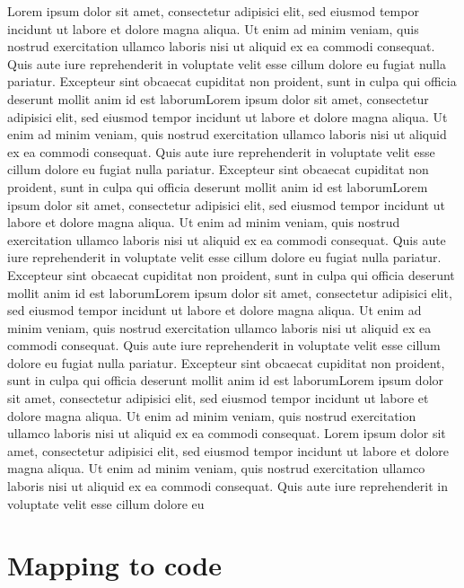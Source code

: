 Lorem ipsum dolor sit amet, consectetur adipisici elit, sed eiusmod tempor incidunt ut labore et dolore magna aliqua.
Ut enim ad minim veniam, quis nostrud exercitation ullamco laboris nisi ut aliquid ex ea commodi consequat. Quis aute iure reprehenderit in voluptate velit esse cillum dolore eu fugiat nulla pariatur. Excepteur sint obcaecat cupiditat non proident, sunt in culpa qui officia deserunt
mollit anim id est laborumLorem ipsum dolor sit amet, consectetur adipisici elit, sed eiusmod tempor incidunt ut labore et dolore magna aliqua. Ut enim ad minim veniam, quis nostrud exercitation ullamco laboris nisi ut aliquid ex ea commodi consequat. Quis aute iure reprehenderit in voluptate velit esse cillum dolore eu fugiat nulla pariatur. Excepteur sint obcaecat cupiditat non proident, sunt in culpa qui officia deserunt mollit anim id est laborumLorem ipsum dolor sit amet, consectetur adipisici elit, sed eiusmod tempor incidunt ut labore et dolore magna aliqua. Ut enim ad minim veniam, quis nostrud exercitation ullamco laboris nisi ut aliquid ex ea commodi consequat. Quis aute iure reprehenderit in voluptate velit esse cillum dolore eu fugiat nulla pariatur. Excepteur sint obcaecat cupiditat non proident, sunt in culpa qui officia deserunt mollit anim id est laborumLorem ipsum dolor sit amet, consectetur adipisici elit, sed eiusmod tempor incidunt ut labore et dolore magna aliqua. Ut enim ad minim veniam, quis nostrud exercitation ullamco laboris nisi ut aliquid ex ea commodi consequat. Quis aute iure reprehenderit in voluptate velit esse cillum dolore eu fugiat nulla pariatur. Excepteur sint obcaecat cupiditat non proident, sunt in culpa qui officia deserunt mollit anim id est laborumLorem ipsum dolor sit amet, consectetur adipisici elit, sed eiusmod tempor incidunt ut labore et dolore magna aliqua. Ut enim ad minim veniam, quis nostrud exercitation ullamco laboris nisi ut aliquid ex ea commodi consequat.
Lorem ipsum dolor sit amet, consectetur adipisici elit, sed eiusmod tempor incidunt ut labore et dolore magna aliqua. Ut enim ad minim veniam, quis nostrud exercitation ullamco laboris nisi ut aliquid ex ea commodi consequat. Quis aute iure reprehenderit in voluptate velit esse cillum dolore eu

\section{Mapping to code}
